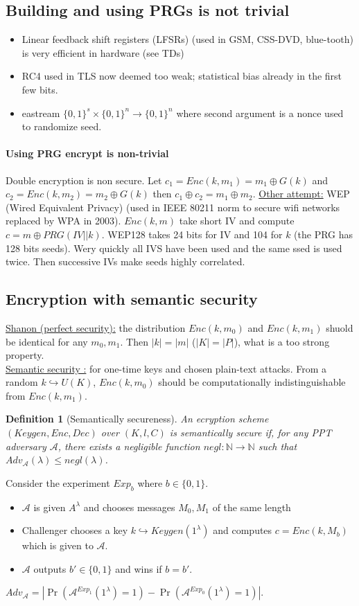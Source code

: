 \documentclass{article}
\newtheorem{defi}[thm]{Definition}
\newcommand{\Def}[3]{\begin{defi}[#1]\label{#2}#3\end{defi}}
\newcommand{\N}{\mathbb{N}}
\newcommand{\A}{\mathcal{A}}
\begin{document}
\subsection{Building and using PRGs is not trivial}
\begin{itemize}
\item Linear feedback shift registers (LFSRs) (used in GSM, CSS-DVD, blue-tooth) is very efficient in hardware (see TDs)
\item RC4 used in TLS now deemed too weak; statistical bias already in the first few bits.
\item eastream $\{0,1\}^s\times\{0,1\}^n\rightarrow\{0,1\}^n$ where second argument is a nonce used to randomize seed.
\end{itemize}
\paragraph{Using PRG encrypt is non-trivial} Double encryption is non secure. Let $c_1=Enc(k,m_1)=m_1\oplus G(k)$ and $c_2=Enc(k,m_2)=m_2\oplus G(k)$ then $c_1\oplus c_2 = m_1\oplus m_2$.
\underline{Other attempt:} WEP (Wired Equivalent Privacy) (used in IEEE 80211 norm to secure wifi networks replaced by WPA in 2003). $Enc(k,m)$ take short IV and compute $c=m\oplus PRG(IV||k)$. WEP128 takes 24 bits for IV and 104 for $k$ (the PRG has 128 bits seeds). Wery quickly all IVS have been used and the same ssed is used twice. Then successive IVs make seeds highly correlated.
\subsection{Encryption with semantic security}

\underline{Shanon (perfect security):} the distribution $Enc(k,m_0)$ and $Enc(k,m_1)$ shuold be identical for any $m_0,m_1$. Then $|k|=|m|$ ($|K|=|P|$), what is a too strong property.\\
\underline{Semantic security :} for one-time keys and chosen plain-text attacks. From a random $k\hookrightarrow U(K)$, $Enc(k,m_0)$ should be computationally indistinguishable from $Enc(k,m_1)$.

\Def{Semantically secureness}{def:semSecure}{An ecryption scheme $(Keygen,Enc,Dec)$ over $(K,l,C)$ is semantically secure if, for any PPT adversary $\A$, there exists a negligible function $negl:\N\rightarrow\N$ such that $Adv_\A(\lambda)\leq negl(\lambda)$.}

Consider the experiment $Exp_b$ where $b\in\{0,1\}$.
\begin{itemize}
\item $\A$ is given $A^\lambda$ and chooses messages $M_0,M_1$ of the same length
\item Challenger chooses a key $k\hookrightarrow Keygen(1^\lambda)$ and computes $c=Enc(k,M_b)$ which is given to $\A$.
\item $\A$ outputs $b'\in\{0,1\}$ and wins if $b=b'$. 
\end{itemize}
$Adv_\A=|\Pr(\A^{Exp_1}(1^\lambda)=1)-\Pr(\A^{Exp_0}(1^\lambda)=1)|$.
\end{document}
